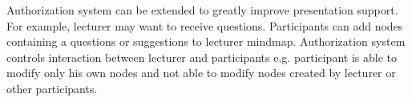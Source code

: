 Authorization system can be extended to greatly improve presentation
support. For example, lecturer may want to receive questions. Participants
can add nodes containing a questions or suggestions to lecturer mindmap.
Authorization system controls interaction between lecturer and participants e.g.
participant is able to modify only his own nodes and not able to modify nodes
created by lecturer or other participants.
